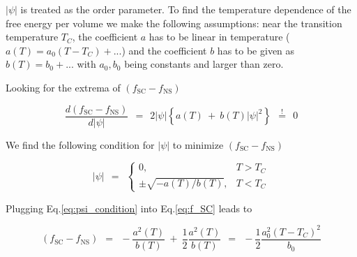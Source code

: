 \documentclass[10pt]{report}
\numberwithin{equation}{chapter}
\newcommand{\myEq}[1]{
  Eq.\ref{#1}
}
\begin{document}
$|\psi|$ is treated as the order parameter. 
To find the temperature dependence of the free energy per volume we make the following assumptions: near the transition temperature $T_C$, the coefficient $a$ has to be linear in temperature ($a(T)=a_0(T-T_C) +...$) and the coefficient $b$ has to be given as $b(T)=b_0+...$ with $a_0, b_0$ being constants and larger than zero.

Looking for the extrema of $(f_\text{SC}-f_\text{NS})$

\begin{equation} \label{eq:f_SC_derived}
  \frac{d (f_\text{SC}-f_\text{NS})}{d|\psi|} ~~=~~ 2|\psi| \left\{a(T) ~+~ b(T)|\psi|^2  \right\} 
  ~~\overset{!}{=}~~ 0
\end{equation}

We find the following condition for $|\psi|$ to minimize $(f_\text{SC}-f_\text{NS})$

\begin{equation} \label{eq:psi_condition}
  |\psi| ~~=~~ \left\{ 
  \begin{array}{cr}
    0, & T>T_C\\
    \pm \sqrt{-a(T)/b(T)}, & T<T_C
  \end{array} \right.
\end{equation}

Plugging \myEq{eq:psi_condition} into \myEq{eq:f_SC} leads to

\begin{equation}
  (f_\text{SC} - f_\text{NS}) ~~=~~ -\frac{a^2(T)}{b(T)} ~+~ \frac{1}{2} \frac{a^2(T)}{b(T)} ~~=~~
  -\frac{1}{2} \frac{a_0^2(T-T_C)^2}{b_0}
\end{equation}
\end{document}
